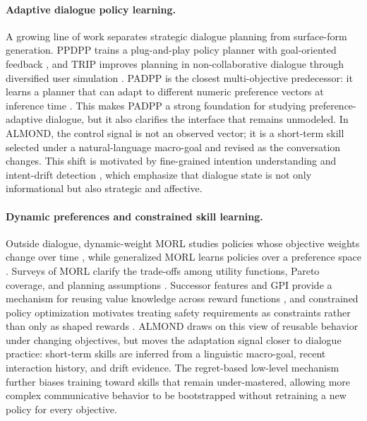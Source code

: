 \paragraph{Adaptive dialogue policy learning.}
A growing line of work separates strategic dialogue planning from surface-form
generation. PPDPP trains a plug-and-play policy planner with goal-oriented
feedback \cite{deng2024plug}, and TRIP improves planning in non-collaborative
dialogue through diversified user simulation \cite{zhang-etal-2024-strength}.
PADPP is the closest multi-objective predecessor: it learns a planner that can
adapt to different numeric preference vectors at inference time
\cite{dao-liao-2025-one}. This makes PADPP a strong foundation for studying
preference-adaptive dialogue, but it also clarifies the interface that remains
unmodeled. In ALMOND, the control signal is not an observed vector; it is a
short-term skill selected under a natural-language macro-goal and revised as
the conversation changes. This shift is motivated by fine-grained intention
understanding and intent-drift detection
\cite{liang-etal-2025-intentionframe,wang2025detecting}, which emphasize that
dialogue state is not only informational but also strategic and affective.

\paragraph{Dynamic preferences and constrained skill learning.}
Outside dialogue, dynamic-weight MORL studies policies whose objective weights
change over time \cite{abels2019dynamic}, while generalized MORL learns
policies over a preference space \cite{yang2019generalized}. Surveys of MORL
clarify the trade-offs among utility functions, Pareto coverage, and planning
assumptions \cite{hayes2022practical}. Successor features and GPI provide a
mechanism for reusing value knowledge across reward functions
\cite{barreto2017successor,barreto2018transfer}, and constrained policy
optimization motivates treating safety requirements as constraints rather than
only as shaped rewards \cite{achiam2017constrained}. ALMOND draws on this view
of reusable behavior under changing objectives, but moves the adaptation signal
closer to dialogue practice: short-term skills are inferred from a linguistic
macro-goal, recent interaction history, and drift evidence. The regret-based
low-level mechanism further biases training toward skills that remain
under-mastered, allowing more complex communicative behavior to be bootstrapped
without retraining a new policy for every objective.

